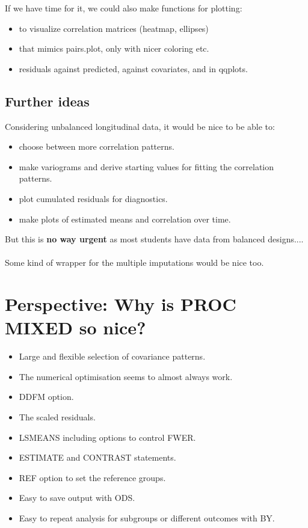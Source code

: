 \documentclass[a4paper,10pt]{article}
\begin{document}
If we have time for it, we could also make functions for plotting:
\begin{itemize}
\item to visualize correlation matrices (heatmap, ellipses)
\item that mimics pairs.plot, only with nicer coloring etc.
\item residuals against predicted, against covariates, and in qqplots.
\end{itemize}

\subsection*{Further ideas}
Considering unbalanced longitudinal data, it would be nice to be able to:
\begin{itemize}
\item choose between more correlation patterns.
\item make variograms and derive starting values for fitting the correlation patterns.
\item plot cumulated residuals for diagnostics.
\item make plots of estimated means and correlation over time.
\end{itemize}
But this is {\bf no way urgent} as most students have data from balanced designs....\\
\\
Some kind of wrapper for the multiple imputations would be nice too.

\section*{Perspective: Why is PROC MIXED so nice?}
\begin{itemize}
\item Large and flexible selection of covariance patterns.
\item The numerical optimisation seems to almost always work.
\item DDFM option.
\item The scaled residuals.
\item LSMEANS including options to control FWER.
\item ESTIMATE and CONTRAST statements.
\item REF option to set the reference groups.
\item Easy to save output with ODS.
\item Easy to repeat analysis for subgroups or different outcomes with BY.
 \end{itemize}
\end{document}
